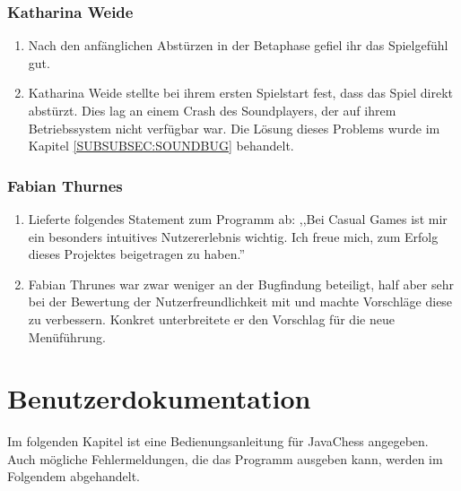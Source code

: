 \documentclass[12pt,a4paper]{article}
\begin{document}
\subsubsection{Katharina Weide}
\begin{enumerate}
	\item{Nach den anfänglichen Abstürzen in der Betaphase gefiel ihr das Spielgefühl gut.}

	\item{Katharina Weide stellte bei ihrem ersten Spielstart fest, dass das Spiel direkt abstürzt. Dies lag an einem Crash des Soundplayers, der auf ihrem Betriebssystem nicht verfügbar war. Die Lösung dieses Problems wurde im Kapitel \ref{SUBSUBSEC:SOUNDBUG} behandelt.}
	
\end{enumerate}

\subsubsection{Fabian Thurnes}
\begin{enumerate}
	\item{Lieferte folgendes Statement zum Programm ab: ,,Bei Casual Games ist mir ein besonders intuitives Nutzererlebnis wichtig. Ich freue mich, zum Erfolg dieses Projektes beigetragen zu haben.''}

	\item{Fabian Thrunes war zwar weniger an der Bugfindung beteiligt, half aber sehr bei der Bewertung der Nutzerfreundlichkeit mit und machte Vorschläge diese zu verbessern. Konkret unterbreitete er den Vorschlag für die neue Menüführung.}
\end{enumerate}


\clearpage\vfill\newpage{}

\section{\sc Benutzerdokumentation}
	Im folgenden Kapitel ist eine Bedienungsanleitung für JavaChess angegeben. Auch mögliche Fehlermeldungen, die das Programm ausgeben kann, werden im Folgendem abgehandelt. 
	
\end{document}
